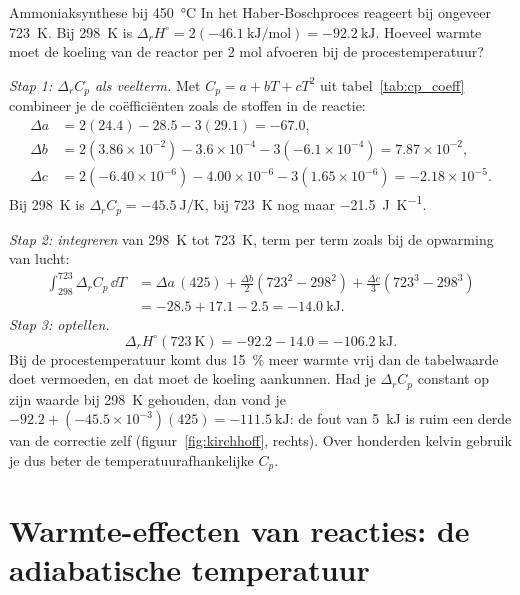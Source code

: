 \begin{voorbeeld}{Ammoniaksynthese bij \SI{450}{\celsius}}
In het Haber-Boschproces reageert  bij ongeveer \SI{723}{\kelvin}. Bij \SI{298}{\kelvin} is $\Delta_r H^\circ = 2(\SI{-46.1}{\kilo\joule\per\mole}) = \SI{-92.2}{\kilo\joule}$. Hoeveel warmte moet de koeling van de reactor per 2 mol  afvoeren bij de procestemperatuur?

\emph{Stap 1: $\Delta_r C_p$ als veelterm.} Met $C_p = a + bT + cT^2$ uit tabel~\ref{tab:cp_coeff} combineer je de co\"effici\"enten zoals de stoffen in de reactie:
\begin{align*}
\Delta a &= 2(24.4) - 28.5 - 3(29.1) = -67.0,\\
\Delta b &= 2(3.86\times10^{-2}) - 3.6\times10^{-4} - 3(-6.1\times10^{-4}) = 7.87\times10^{-2},\\
\Delta c &= 2(-6.40\times10^{-6}) - 4.00\times10^{-6} - 3(1.65\times10^{-6}) = -2.18\times10^{-5}.
\end{align*}
Bij \SI{298}{\kelvin} is $\Delta_r C_p = \SI{-45.5}{\joule\per\kelvin}$, bij \SI{723}{\kelvin} nog maar \SI{-21.5}{\joule\per\kelvin}.

\emph{Stap 2: integreren} van \SI{298}{\kelvin} tot \SI{723}{\kelvin}, term per term zoals bij de opwarming van lucht:
\begin{align*}
\int_{298}^{723} \Delta_r C_p\,\dd T &= \Delta a\,(425) + \frac{\Delta b}{2}(723^2 - 298^2) + \frac{\Delta c}{3}(723^3 - 298^3)\\
&= -28.5 + 17.1 - 2.5 = \SI{-14.0}{\kilo\joule}.
\end{align*}
\emph{Stap 3: optellen.}
\[
\Delta_r H^\circ(\SI{723}{\kelvin}) = -92.2 - 14.0 = \SI{-106.2}{\kilo\joule}.
\]
Bij de procestemperatuur komt dus \SI{15}{\percent} meer warmte vrij dan de tabelwaarde doet vermoeden, en dat moet de koeling aankunnen. Had je $\Delta_r C_p$ constant op zijn waarde bij \SI{298}{\kelvin} gehouden, dan vond je $-92.2 + (-45.5\times10^{-3})(425) = \SI{-111.5}{\kilo\joule}$: de fout van \SI{5}{\kilo\joule} is ruim een derde van de correctie zelf (figuur~\ref{fig:kirchhoff}, rechts). Over honderden kelvin gebruik je dus beter de temperatuurafhankelijke $C_p$.
\end{voorbeeld}


\section{Warmte-effecten van reacties: de adiabatische temperatuur}
\label{sec:warmte-effecten}

